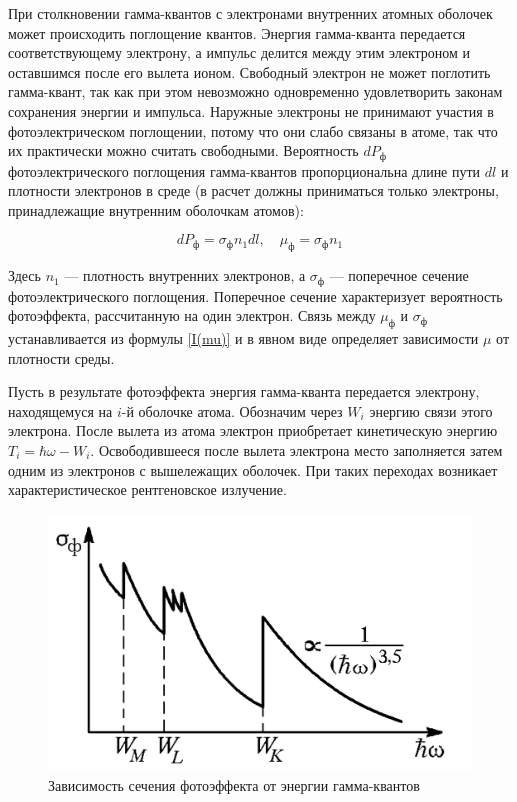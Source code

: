\documentclass[a4paper,12pt]{article} %
\begin{document}
	\noindent При столкновении гамма-квантов с электронами внутренних атомных оболочек может происходить поглощение квантов. Энергия гамма-кванта передается соответствующему электрону, а импульс делится между этим электроном и оставшимся после
	его вылета ионом. Свободный электрон не может поглотить гамма-квант,
	так как при этом невозможно одновременно удовлетворить законам
	сохранения энергии и импульса. Наружные электроны не принимают участия в фотоэлектрическом поглощении, потому что они слабо
	связаны в атоме, так что их практически можно считать свободными.
	Вероятность $ dP_\text{ф} $ фотоэлектрического поглощения гамма-квантов пропорциональна длине пути $ dl $ и плотности электронов в среде (в расчет
	должны приниматься только электроны, принадлежащие внутренним
	оболочкам атомов):
	
	\begin{equation}\label{mu ph}
	dP_\text{ф} = \sigma_\text{ф} n_1 dl, \quad \mu_\text{ф} = \sigma_\text{ф} n_1
	\end{equation}
	
\noindent Здесь $ n_1 $ --- плотность внутренних электронов, а $ \sigma_\text{ф} $ --- поперечное сечение фотоэлектрического поглощения. Поперечное сечение характеризует вероятность фотоэффекта, рассчитанную на один электрон. Связь между $ \mu_\text{ф} $ и $ \sigma_\text{ф} $ устанавливается из формулы \eqref{I(mu)} и в явном виде определяет зависимости $ \mu $ от плотности среды.

\medskip
	
\noindent Пусть в результате фотоэффекта энергия гамма-кванта передается
	электрону, находящемуся на $ i $-й оболочке атома. Обозначим через $ W_i $
	энергию связи этого электрона. После вылета из атома электрон приобретает кинетическую энергию $ T_i = \hbar \omega - W_i $.
	Освободившееся после вылета электрона место заполняется затем
	одним из электронов с вышележащих оболочек. При таких переходах
	возникает характеристическое рентгеновское излучение.
	
	\begin{figure}
		\includegraphics[width=\linewidth]{photo}
		\caption{Зависимость сечения фотоэффекта от энергии гамма-квантов}
		\label{ris photo}
	\end{figure}
	
\end{document}
